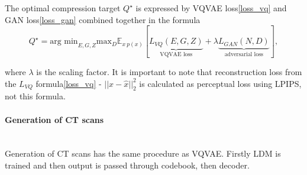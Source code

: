 The optimal compression target $Q^{\star}$ is expressed by VQVAE loss\eqref{loss_vq} and GAN loss\eqref{loss_gan} combined together in the formula
\begin{equation}
    Q^{\star} = \text{arg min}_{E,G,Z} \text{max}_D \mathbb{E}_{x~p(x)} [\underbrace{L_{VQ}(E, G, Z)}_{\text{VQVAE loss}} + \lambda\underbrace{L_{GAN}(N, D)}_{\text{adversarial loss}}],
\end{equation}

where $\lambda$ is the scaling factor. It is important to note that reconstruction loss from the $L_{VQ}$ formula\eqref{loss_vq} - $||x-\hat{x}||^2_2$ is calculated as perceptual loss using LPIPS, not this formula. 



\paragraph{Generation of CT scans}\mbox{}\\
\indent Generation of CT scans has the same procedure as VQVAE. Firstly LDM is trained and then output is passed through codebook, then decoder. 




